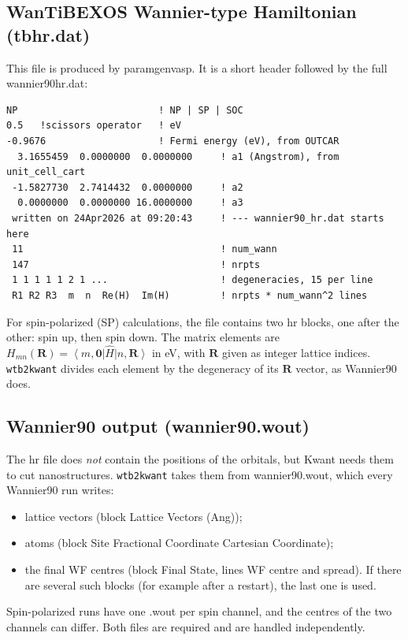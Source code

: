 \documentclass[11pt,a4paper]{article}
\newcommand{\code}[1]{{\ttfamily\def\_{\textunderscore\allowbreak}\def\slash{/\allowbreak}#1}}
\newcommand{\wtb}{WanTiBEXOS}
\newcommand{\tool}{\texttt{wtb2kwant}}
\newcommand{\ket}[1]{\left|#1\right\rangle}
\newcommand{\bra}[1]{\left\langle#1\right|}
\begin{document}
\subsection{\wtb{} Wannier-type Hamiltonian (\code{tb\_hr.dat})}
This file is produced by \code{param\_gen\_vasp}. It is a short header followed by the
full \code{wannier90\_hr.dat}:
\begin{lstlisting}
NP                         ! NP | SP | SOC
0.5   !scissors operator   ! eV
-0.9676                    ! Fermi energy (eV), from OUTCAR
  3.1655459  0.0000000  0.0000000     ! a1 (Angstrom), from unit_cell_cart
 -1.5827730  2.7414432  0.0000000     ! a2
  0.0000000  0.0000000 16.0000000     ! a3
 written on 24Apr2026 at 09:20:43     ! --- wannier90_hr.dat starts here
 11                                   ! num_wann
 147                                  ! nrpts
 1 1 1 1 1 2 1 ...                    ! degeneracies, 15 per line
 R1 R2 R3  m  n  Re(H)  Im(H)         ! nrpts * num_wann^2 lines
\end{lstlisting}
For spin-polarized (SP) calculations, the file contains two \code{hr} blocks, one after
the other: spin up, then spin down. The matrix elements are
$H_{mn}(\mathbf{R})=\bra{m,\mathbf{0}}\hat H\ket{n,\mathbf{R}}$ in eV, with $\mathbf{R}$
given as integer lattice indices. \tool{} divides each element by the degeneracy of its
$\mathbf{R}$ vector, as Wannier90 does.

\subsection{Wannier90 output (\code{wannier90.wout})}
The \code{hr} file does \emph{not} contain the positions of the orbitals, but Kwant needs
them to cut nanostructures. \tool{} takes them from \code{wannier90.wout}, which every
Wannier90 run writes:
\begin{itemize}[nosep]
  \item lattice vectors (block \code{Lattice Vectors (Ang)});
  \item atoms (block \code{Site  Fractional Coordinate  Cartesian Coordinate});
  \item the final WF centres (block \code{Final State}, lines
        \code{WF centre and spread}). If there are several such blocks (for example after a
        restart), the last one is used.
\end{itemize}
Spin-polarized runs have one \code{.wout} per spin channel, and the centres of the two
channels can differ. Both files are required and are handled independently.
\end{document}
